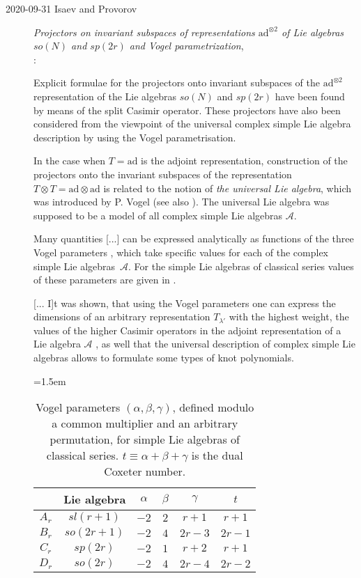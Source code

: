 \begin{description}
\item[2020-09-31 Isaev and Provorov]
{\em Projectors on invariant subspaces of representations
{$\mathrm{ad}^{\otimes 2}$} of {Lie} algebras ${so(N)}$ and {$sp(2r)$}
and {Vogel} parametrization},\\
:

Explicit formulae for the projectors onto invariant subspaces of the
$\mathrm{ad}^{\otimes 2}$ representation of the Lie algebras $so(N)$ and $sp(2r)$
have been found by means of the split Casimir operator. These projectors
have also been considered from the viewpoint of the universal complex
simple Lie algebra description by using the Vogel parametrisation.

In the case when $T=\mathrm{ad}$ is the adjoint representation,
construction of the projectors onto the invariant subspaces of the
representation $T\otimes T=\mathrm{ad}\otimes \mathrm{ad}$ is related to
the notion of \textit{the universal Lie algebra}, which was introduced by
P. Vogel (see also ). The universal Lie
algebra was supposed to be a model of all complex simple Lie algebras
$\mathcal{A}$.

Many quantities [...] can be expressed analytically\cite{MkSeVe12} as
functions of the three Vogel parameters \cite{PV99,lands01}, which take
specific values for each of the complex simple Lie
algebras~$\mathcal{A}$. For the simple Lie algebras of classical series
values of these parameters are given in .

[... I]t was shown, that using the Vogel
parameters one can express the dimensions of an arbitrary representation
$T_{\lambda'}$ with the highest weight, the values of the
higher Casimir operators in the adjoint representation of a Lie algebra
$\mathcal{A}$ \cite{MkSeVe12}, as well that
the universal description of complex simple Lie algebras allows to
formulate some types of knot polynomials.

\begin{table}
\small
\centering
\caption{\label{IsaPro20:tab3}
Vogel parameters $(\alpha,\beta,\gamma)$, defined modulo a common
multiplier and an arbitrary permutation, for simple Lie algebras of
classical series. $t\equiv \alpha+\beta+\gamma$ is the
dual Coxeter number.}
\vspace*{1mm}\tabcolsep=1.5em
\renewcommand{\arraystretch}{1.2}
\begin{tabular}{|c|c|c|c|c|c|}
\hline
      & Lie algebra & $\alpha$ & $\beta$ & $\gamma$ & $t$\\
\hline
$A_r$ & $sl(r+1)$ & $-2$ & $2$ & $r+1$ & $r+1$\\
\hline
$B_r$ & $so(2r+1)$ & $-2$ & $4$ & $2r-3$ & $2r-1$\\
\hline
$C_r$ & $sp(2r)$ & $-2$ & $1$ & $r+2$ & $r+1$\\
\hline
$D_r$ & $so(2r)$ & $-2$ & $4$ & $2r-4$ & $2r-2$\\
\hline
\end{tabular}
\end{table}



\end{description}
